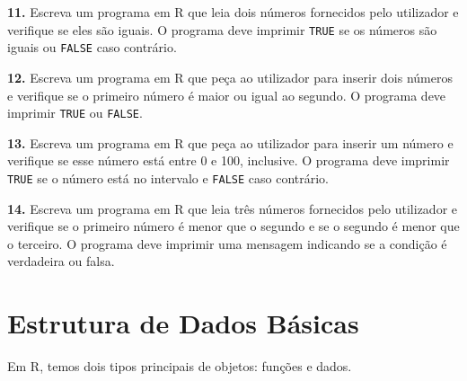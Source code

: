 \documentclass[
]{book}
\begin{document}
\textbf{11.} Escreva um programa em R que leia dois números fornecidos pelo
utilizador e verifique se eles são iguais. O programa deve imprimir
\texttt{TRUE} se os números são iguais ou \texttt{FALSE} caso contrário.

\textbf{12.} Escreva um programa em R que peça ao utilizador para inserir
dois números e verifique se o primeiro número é maior ou igual ao
segundo. O programa deve imprimir \texttt{TRUE} ou \texttt{FALSE}.

\textbf{13.} Escreva um programa em R que peça ao utilizador para inserir um
número e verifique se esse número está entre 0 e 100, inclusive. O
programa deve imprimir \texttt{TRUE} se o número está no intervalo e \texttt{FALSE}
caso contrário.

\textbf{14.} Escreva um programa em R que leia três números fornecidos pelo
utilizador e verifique se o primeiro número é menor que o segundo e se o
segundo é menor que o terceiro. O programa deve imprimir uma mensagem
indicando se a condição é verdadeira ou falsa.

\chapter{Estrutura de Dados Básicas}\label{estrutura-de-dados-buxe1sicas}

Em R, temos dois tipos principais de objetos: funções e dados.
\end{document}

